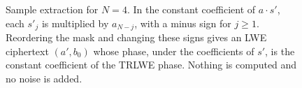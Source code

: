 \begin{figure}[!htb]
\centering

\caption{Sample extraction for $N=4$. In the constant coefficient of
$a\cdot s'$, each $s'_j$ is multiplied by $a_{N-j}$, with a minus sign for
$j\ge1$. Reordering the mask and changing these signs gives an LWE ciphertext
$(a',b_0)$ whose phase, under the coefficients of $s'$, is the constant
coefficient of the TRLWE phase. Nothing is computed and no noise is added.}
\label{fig:extract}
\end{figure}
